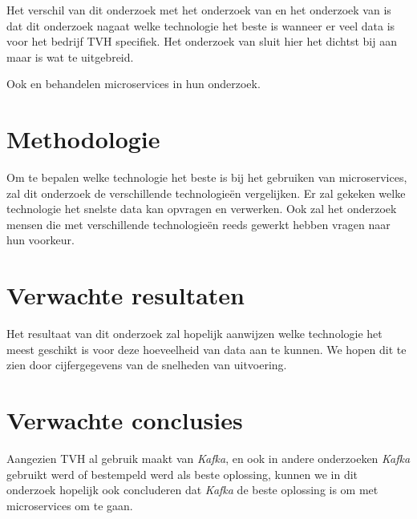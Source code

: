 Het verschil van dit onderzoek met het onderzoek van \textcite{Shadija2017} en het onderzoek van \textcite{Khazaei2017} is dat dit onderzoek nagaat welke technologie het beste is wanneer er veel data is voor het bedrijf TVH specifiek. Het onderzoek van \textcite{Khazaei2017} sluit hier het dichtst bij aan maar is wat te uitgebreid.

Ook \textcite{Nycander2015} en \textcite{Cherradi2017} behandelen microservices in hun onderzoek.




\section{Methodologie}
\label{sec:methodologie}
Om te bepalen welke technologie het beste is bij het gebruiken van microservices, zal dit onderzoek de verschillende technologieën vergelijken. Er zal gekeken welke technologie het snelste data kan opvragen en verwerken. Ook zal het onderzoek mensen die met verschillende technologieën reeds gewerkt hebben vragen naar hun voorkeur. 

\section{Verwachte resultaten}
\label{sec:verwachte_resultaten}
Het resultaat van dit onderzoek zal hopelijk aanwijzen welke technologie het meest geschikt is voor deze hoeveelheid van data aan te kunnen. We hopen dit te zien door cijfergegevens van de snelheden van uitvoering. 


\section{Verwachte conclusies}
\label{sec:verwachte_conclusies}

Aangezien TVH al gebruik maakt van \emph{Kafka}, en ook in andere onderzoeken \emph{Kafka} gebruikt werd of bestempeld werd als beste oplossing, kunnen we in dit onderzoek hopelijk ook concluderen dat \emph{Kafka} de beste oplossing is om met microservices om te gaan.

